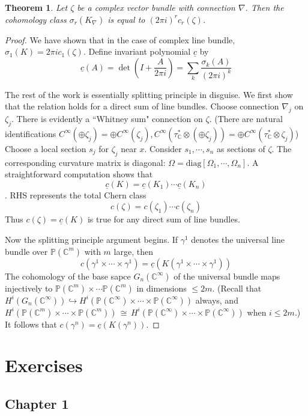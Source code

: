 \documentclass[12pt]{article}
\theoremstyle{plain}
\newtheorem{theorem}[equation]{Theorem}
\theoremstyle{definition}
\newcommand{\IC}{\mathbb{C}}
\newcommand{\IP}{\mathbb{P}}
\newcommand\iso{\,{\cong}\,}
\newcommand\tensor{{\otimes}}
\newcommand{\<}{\langle}
\renewcommand{\>}{\rangle}
\newcommand{\into}{\hookrightarrow}
\newcommand{\Ohm}{\Omega}
\begin{document}
\begin{theorem}
Let $\zeta$ be a complex vector bundle with connection $\nabla$. Then the cohomology class $\sigma_r(K_\nabla)$ is equal to $(2 \pi i)^r c_r(\zeta)$.  
\end{theorem}
\begin{proof}
We have shown that in the case of complex line bundle, $\sigma_1(K) = 2 \pi i c_1(\zeta)$. Define invariant polynomial $\underline{c}$ by 
$$ \underline{c}(A) = \det(I + \frac{A}{2 \pi i }) = \sum_k \frac{\sigma_k(A)}{(2 \pi i)^k} $$ 

The rest of the work is essentially splitting principle in disguise. We first show that the relation holds for a direct sum of line bundles. Choose connection $\nabla_j$ on $\zeta_j$. There is evidently a ``Whitney sum" connection on $\zeta$. (There are natural identifications $C^\infty(\oplus \zeta_j) = \oplus C^\infty(\zeta_j), C^\infty(\tau_\IC^* \tensor (\oplus \zeta_j)) = \oplus C^\infty(\tau_\IC^* \tensor \zeta_j)$) Choose a local section $s_j$ for $\zeta_j$ near $x$. Consider $s_1, \cdots, s_n$ as sections of $\zeta$. The corresponding curvature matrix is diagonal: $\Ohm = \mathrm{diag}[\Ohm_1, \cdots, \Ohm_n]$. A straightforward computation shows that $$\underline{c}(K) = \underline{c}(K_1) \cdots \underline{c}(K_n)$$. RHS represents the total Chern class $$c(\zeta) = c(\zeta_1) \cdots c(\zeta_n)$$
Thus $c(\zeta) = \underline{c}(K)$ is true for any direct sum of line bundles. 

Now the splitting principle argument begins. If $\gamma^1$ denotes the universal line bundle over $\IP(\IC^m)$ with $m$ large, then $$c(\gamma^1 \times \cdots \times \gamma^1) = \underline{c}(K(\gamma^1 \times \cdots \times \gamma^1))$$
The cohomology of the base sapce $G_n(\IC^\infty)$ of the universal bundle maps injectively to $\IP(\IC^m) \times \cdots \IP(\IC^m)$ in dimensions $\le 2m$. (Recall that $H^i(G_n(\IC^\infty)) \into H^i(\IP(\IC^\infty) \times \cdots \times \IP(\IC^\infty))$ always, and $H^i(\IP(\IC^m) \times \cdots \times \IP(\IC^m)) \iso H^i(\IP(\IC^\infty) \times \cdots \times \IP(\IC^\infty))$ when $i \le 2m$.) It follows that $c(\gamma^n) = \underline{c}(K(\gamma^n))$. 
\end{proof}



\section{Exercises}
\subsection*{Chapter 1}
\end{document}
